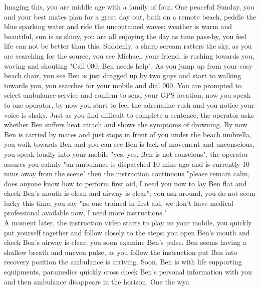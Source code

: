 Imaging this, you are middle age with a family of four. One peaceful Sunday, you and your best mates plan for a great day out, bath on a remote beach, peddle the blue sparking water and ride the uncontained waves; weather is warm and beautiful, sun is as shiny, you are all enjoying the day as time pass-by, you feel life can not be better than this. Suddenly, a sharp scream ratters the sky, as you are searching for the source, you see Michael, your friend, is rushing towards you, waving and shouting "Call 000, Ben needs help". As you jump up from your cosy beach chair, you see Ben is just dragged up by two guys and start to walking towards you, you searches for your mobile and dial 000. You are prompted to select ambulance service and confirm to send your GPS location, now you speak to one operator, by now you start to feel the adrenaline rush and you notice your voice is shaky. Just as you find difficult to complete a sentence, the operator asks whether Ben suffers heat attach and shows the symptoms of drowning. By now Ben is carried by mates and just stops in front of you under the beach umbrella, you walk towards Ben and you can see Ben is lack of movement and unconscious, you speak loudly into your mobile "yes, yes, Ben is not conscious", the operator assures you calmly "an ambulance is dispatched 10 mins ago and is currently 10 mins away from the scene" then the instruction continuous "please remain calm, does anyone know how to perform first aid, I need you now to lay Ben flat and check Ben's mouth is clean and airway is clear"; you ask around, you do not seem lucky this time, you say "no one trained in first aid, we don't have medical professional available now, I need more instructions." \\
A moment later, the instruction video starts to play on your mobile, you quickly put yourself together and follow closely to the steps: you open Ben's mouth and check Ben's airway is clear, you soon examine Ben's pulse. Ben seems having a shallow breath and uneven pulse, as you follow the instruction put Ben into recovery position the ambulance is arriving. Soon, Ben is with life supporting equipments, paramedics quickly cross check Ben's personal information with you and then ambulance disappears in the horizon. One the wya 